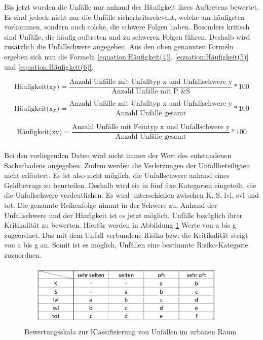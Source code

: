 Bis jetzt wurden die Unfälle nur anhand der Häufigkeit ihres Auftretens bewertet. Es sind jedoch nicht nur die Unfälle sicherheitsrelevant, welche am häufigsten vorkommen, sondern auch solche, die schwere Folgen haben. Besonders kritisch sind Unfälle, die häufig auftreten und zu schweren Folgen führen. Deshalb wird zusätzlich die Unfallschwere angegeben. Aus den oben genannten Formeln ergeben sich nun die Formeln \ref{equation:Häufigkeit(4)}, \ref{equation:Häufigkeit(5)} und \ref{equation:Häufigkeit(6)}.

\begin{equation}\label{equation:Häufigkeit(4)}
\text{Häufigkeit(xy)} = \dfrac{\text{Anzahl Unfälle mit Unfalltyp x und Unfallschwere y}}{\text{Anzahl Unfälle mit P \& S}}*100
\end{equation}

\begin{equation}\label{equation:Häufigkeit(5)}
\text{Häufigkeit(xy)} = \dfrac{\text{Anzahl Unfälle mit Unfalltyp x und Unfallschwere y}}{\text{Anzahl Unfälle gesamt}}*100
\end{equation}

\begin{equation}\label{equation:Häufigkeit(6)}
\text{Häufigkeit(xy)} = \dfrac{\text{Anzahl Unfälle mit Feintyp x und Unfallschwere y}}{\text{Anzahl Unfälle gesamt}}*100
\end{equation}\\

Bei den vorliegenden Daten wird nicht immer der Wert des entstandenen Sachschadens angegeben. Zudem werden die Verletzungen der Unfallbeteiligten nicht erläutert. Es ist also nicht möglich, die Unfallschwere anhand eines Geldbetrags zu beurteilen. Deshalb wird sie in fünf fixe Kategorien eingeteilt, die die Unfallschwere verdeutlichen. Es wird unterschieden zwischen \ac{K}, \ac{S}, \ac{lvl}, \ac{svl} und \ac{tot}. Die genannte Reihenfolge nimmt in der Schwere zu. Anhand der Unfallschwere und der Häufigkeit ist es jetzt möglich, Unfälle bezüglich ihrer Kritikalität zu bewerten. Hierfür werden in Abbildung \ref{fig:Bewertungsskala} Werte von a bis g zugeordnet. Das mit dem Unfall verbundene Risiko bzw. die Kritikalität steigt von a bis g an. Somit ist es möglich, Unfällen eine bestimmte Risiko-Kategorie zuzuordnen.

\begin{savenotes}
	\begin{figure}[H]
		\centering
		\includegraphics[width=10.6cm,height=3cm]{figures/Bewertungsskala}
		\caption[Bewertungsskala zur Klassifizierung von Unfällen im urbanen Raum]{Bewertungsskala zur Klassifizierung von Unfällen im urbanen Raum}\label{fig:Bewertungsskala}
	\end{figure}
\end{savenotes}

